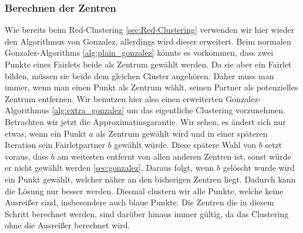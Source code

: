 \begin{algorithm}
        \end{algorithm}



        \subsubsection{Berechnen der Zentren}
            Wie bereits beim Red-Clustering \ref{sec:Red-Clustering} verwenden wir hier wieder den Algorithmus von Gonzalez, allerdings wird dieser erweitert. Beim normalen Gonzalez-Algorithms \ref{alg:plain_gonzalez} könnte es vorkommen, dass zwei Punkte eines Fairlets beide als Zentrum gewählt werden. Da sie aber ein Fairlet bilden, müssen sie beide dem gleichen Cluster angehören. Daher muss man immer, wenn man einen Punkt als Zentrum wählt, seinen Partner als potenzielles Zentrum entfernen. Wir benutzen hier also einen erweiterten Gonzalez-Algorithmus \ref{alg:extra_gonzalez} um das eigentliche Clustering vorzunehmen. \newline
            Betrachten wir jetzt die Approximatinsgarantie. Wir sehen, es ändert sich nur etwas, wenn ein Punkt $a$ als Zentrum gewählt wird und in einer späteren Iteration sein Fairletpartner $b$ gewählt würde. Diese spätere Wahl von $b$ setzt voraus, dass $b$ am weitesten entfernt von allen anderen Zentren ist, sonst würde er nicht gewählt werden \ref{sec:gonzalez}. Daraus folgt, wenn $b$ gelöscht wurde wird ein Punkt gewählt, welcher näher an den bisherigen Zentren liegt. Dadurch kann die Lösung nur besser werden. \newline
            Diesmal clustern wir alle Punkte, welche keine Ausreißer sind, insbesondere auch blaue Punkte.
            Die Zentren die in diesem Schritt berechnet werden, sind darüber hinaus immer gültig, da das Clustering ohne die Ausreißer berechnet wird.

